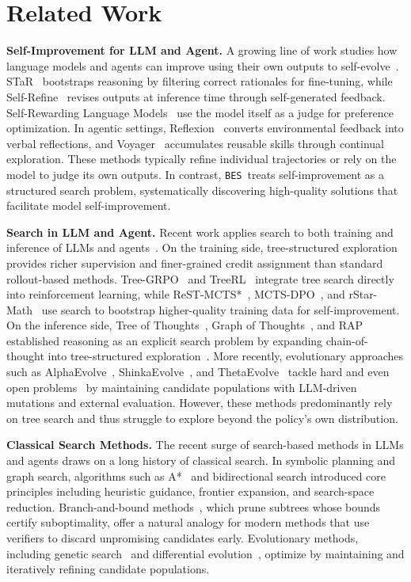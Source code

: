 \documentclass{llmxive}
\providecommand{\ours}{\texttt{BES}}
\begin{document}
\section{Related Work}

\textbf{Self-Improvement for LLM and Agent.} A growing line of work studies how language models and agents can improve using their own outputs to self-evolve~\citep{selfimprovement, selftraining}. STaR~\citep{star} bootstraps reasoning by filtering correct rationales for fine-tuning, while Self-Refine~\citep{madaan2023self} revises outputs at inference time through self-generated feedback. Self-Rewarding Language Models~\citep{selfreward} use the model itself as a judge for preference optimization. In agentic settings, Reflexion~\citep{shinn2023reflexion} converts environmental feedback into verbal reflections, and Voyager~\citep{wang2023voyager} accumulates reusable skills through continual exploration. These methods typically refine individual trajectories or rely on the model to judge its own outputs. In contrast, \ours\ treats self-improvement as a structured search problem, systematically discovering high-quality solutions that facilitate model self-improvement.

\textbf{Search in LLM and Agent.} Recent work applies search to both training and inference of LLMs and agents~\citep{efficientevolution, funsearch}. On the training side, tree-structured exploration provides richer supervision and finer-grained credit assignment than standard rollout-based methods. Tree-GRPO~\citep{treegrpo} and TreeRL~\citep{treerl} integrate tree search directly into reinforcement learning, while ReST-MCTS*~\citep{restmcts}, MCTS-DPO~\citep{mctsdpo}, and rStar-Math~\citep{rstarmath} use search to bootstrap higher-quality training data for self-improvement. On the inference side, Tree of Thoughts~\citep{tot}, Graph of Thoughts~\citep{got}, and RAP~\citep{rap} established reasoning as an explicit search problem by expanding chain-of-thought into tree-structured exploration~\citep{abmcts}. More recently, evolutionary approaches such as AlphaEvolve~\citep{alphaevolve}, ShinkaEvolve~\citep{shinkaevolve}, and ThetaEvolve~\citep{thetaevolve} tackle hard and even open problems~\citep{languageevolutionary} by maintaining candidate populations with LLM-driven mutations and external evaluation. However, these methods predominantly rely on tree search and thus struggle to explore beyond the policy's own distribution.

\textbf{Classical Search Methods.} The recent surge of search-based methods in LLMs and agents draws on a long history of classical search. In symbolic planning and graph search, algorithms such as A*~\citep{astar} and bidirectional search introduced core principles including heuristic guidance, frontier expansion, and search-space reduction. Branch-and-bound methods~\citep{bbsurvey}, which prune subtrees whose bounds certify suboptimality, offer a natural analogy for modern methods that use verifiers to discard unpromising candidates early. Evolutionary methods, including genetic search~\citep{genesearch,geneprogram} and differential evolution~\citep{differentialevolution}, optimize by maintaining and iteratively refining candidate populations. 
\end{document}
